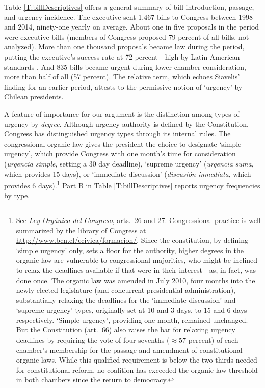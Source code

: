 \documentclass[letter,12pt]{article}
\begin{document}
Table \ref{T:billDescriptives} offers a general summary of bill introduction, passage, and urgency incidence. The executive sent 1,467 bills to Congress between 1998 and 2014, ninety-one yearly on average. About one in five proposals in the period were executive bills (members of Congress proposed 79 percent of all bills, not analyzed). More than one thousand proposals became law during the period, putting the executive's success rate at 72 percent---high by Latin American standards \citep{morgenstern.nacif.2002}. And 835 bills became urgent during lower chamber consideration, more than half of all (57 percent). The relative term, which echoes Siavelis' finding for an earlier period, attests to the permissive notion of `urgency' by Chilean presidents. 

A feature of importance for our argument is the distinction among types of urgency by \emph{degree}. Although urgency authority is defined by the Constitution, Congress has distinguished urgency types through its internal rules. The congressional organic law gives the president the choice to designate `simple urgency', which provide Congress with one month's time for consideration (\emph{urgencia simple}, setting a 30 day deadline), `supreme urgency' (\emph{urgencia suma}, which provides 15 days), or `immediate discussion' (\emph{discusión inmediata}, which provides 6 days).\footnote{See \emph{Ley Orgánica del Congreso}, arts.\ 26 and 27. Congressional practice is well summarized by the library of Congress at \url{http://www.bcn.cl/ecivica/formacion/}. Since the constitution, by defining `simple urgency' only, sets a floor for the authority, higher degrees in the organic law are vulnerable to congressional majorities, who might be inclined to relax the deadlines available if that were in their interest---as, in fact, was done once. The organic law was amended in July 2010, four months into the newly elected legislature (and concurrent presidential administration), substantially relaxing the deadlines for the `immediate discussion' and `supreme urgency' types, originally set at 10 and 3 days, to 15 and 6 days respectively. `Simple urgency', providing one month, remained unchanged. But the Constitution (art.~66) also raises the bar for relaxing urgency deadlines by requiring the vote of four-sevenths ($\approx 57$ percent) of each chamber's membership for the passage and amendment of constitutional organic laws. While this qualified requirement is below the two-thirds needed for constitutional reform, no coalition has exceeded the organic law threshold in both chambers since the return to democracy.} Part B in Table \ref{T:billDescriptives} reports urgency frequencies by type.
\end{document}
